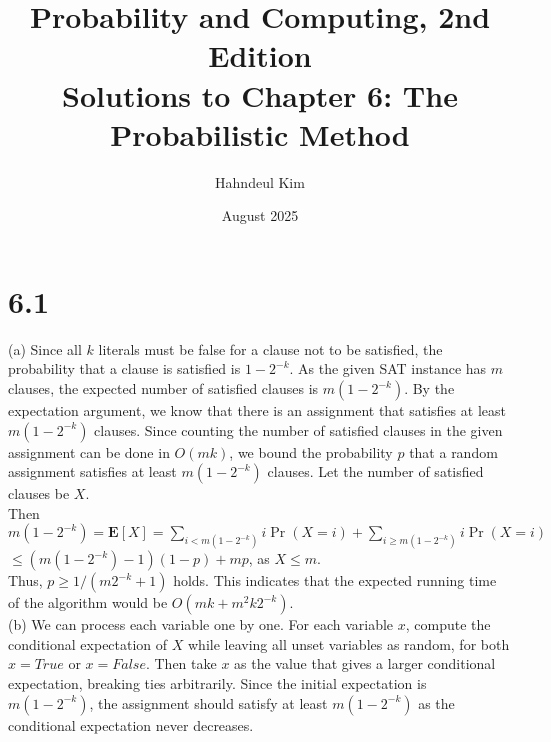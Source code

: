\documentclass{article}
\title {Probability and Computing, 2nd Edition \\[2ex] \large Solutions to Chapter 6: The Probabilistic Method}
\author{Hahndeul Kim}
\date{August 2025}
\begin{document}
\maketitle
\newpage
\section*{6.1}
(a) Since all $k$ literals must be false for a clause not to be satisfied, the probability that a clause is satisfied is $1-2^{-k}$.
As the given SAT instance has $m$ clauses, the expected number of satisfied clauses is $m(1-2^{-k})$.
By the expectation argument, we know that there is an assignment that satisfies at least $m(1-2^{-k})$ clauses.
Since counting the number of satisfied clauses in the given assignment can be done in $O(mk)$, we bound the probability $p$ that a random assignment satisfies at least $m(1-2^{-k})$ clauses. Let the number of satisfied clauses be $X$.\\
Then $m(1-2^{-k})=\textbf{E}[X]=\sum\limits_{i<m(1-2^{-k})}i\Pr(X=i)+\sum\limits_{i \geq m(1-2^{-k})}i\Pr(X=i)$\\
$\leq \left(m(1-2^{-k})-1\right)(1-p)+mp$, as $X \leq m$.\\
Thus, $p \geq 1/(m2^{-k}+1)$ holds. This indicates that the expected running time of the algorithm would be $O(mk+m^2k2^{-k})$.\\
(b) We can process each variable one by one.
For each variable $x$, compute the conditional expectation of $X$ while leaving all unset variables as random, for both $x=True$ or $x=False$.
Then take $x$ as the value that gives a larger conditional expectation, breaking ties arbitrarily.
Since the initial expectation is $m(1-2^{-k})$, the assignment should satisfy at least $m(1-2^{-k})$ as the conditional expectation never decreases.
\end{document}
